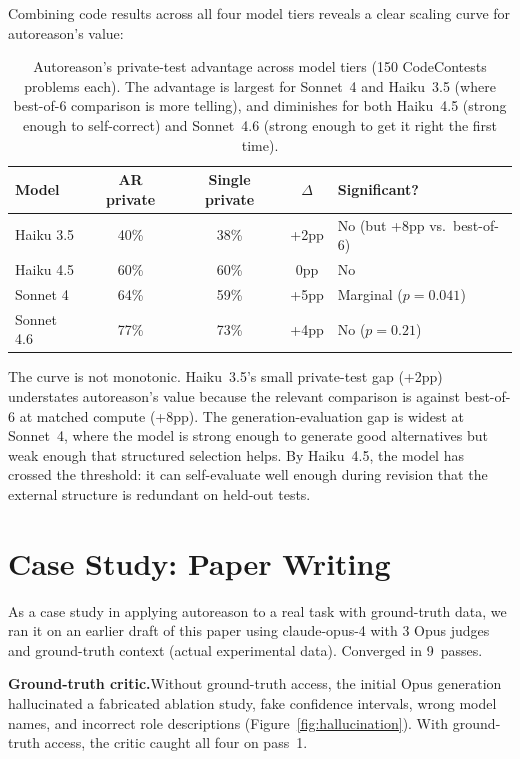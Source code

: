 \documentclass[11pt]{article}
\begin{document}
Combining code results across all four model tiers reveals a clear scaling curve for autoreason's value:

\begin{table}[H]
\centering
\small
\begin{tabular}{@{}lcccl@{}}
\toprule
\textbf{Model} & \textbf{AR private} & \textbf{Single private} & \textbf{$\Delta$} & \textbf{Significant?} \\
\midrule
\rowcolor{TableShade}
Haiku 3.5 & 40\% & 38\% & +2pp & No (but +8pp vs.\ best-of-6) \\
Haiku 4.5 & 60\% & 60\% & 0pp & No \\
\rowcolor{TableShade}
Sonnet 4 & 64\% & 59\% & +5pp & Marginal ($p{=}0.041$) \\
Sonnet 4.6 & 77\% & 73\% & +4pp & No ($p{=}0.21$) \\
\bottomrule
\end{tabular}
\caption{Autoreason's private-test advantage across model tiers (150 CodeContests problems each). The advantage is largest for Sonnet~4 and Haiku~3.5 (where best-of-6 comparison is more telling), and diminishes for both Haiku~4.5 (strong enough to self-correct) and Sonnet~4.6 (strong enough to get it right the first time).}
\label{tab:code_scaling}
\end{table}

The curve is not monotonic. Haiku~3.5's small private-test gap (+2pp) understates autoreason's value because the relevant comparison is against best-of-6 at matched compute (+8pp). The generation-evaluation gap is widest at Sonnet~4, where the model is strong enough to generate good alternatives but weak enough that structured selection helps. By Haiku~4.5, the model has crossed the threshold: it can self-evaluate well enough during revision that the external structure is redundant on held-out tests.

\section{Case Study: Paper Writing}
\label{sec:paper}

As a case study in applying autoreason to a real task with ground-truth data, we ran it on an earlier draft of this paper using claude-opus-4 with 3 Opus judges and ground-truth context (actual experimental data). Converged in 9~passes.

\textbf{Ground-truth critic.}\enspace Without ground-truth access, the initial Opus generation hallucinated a fabricated ablation study, fake confidence intervals, wrong model names, and incorrect role descriptions (Figure~\ref{fig:hallucination}). With ground-truth access, the critic caught all four on pass~1.
\end{document}
